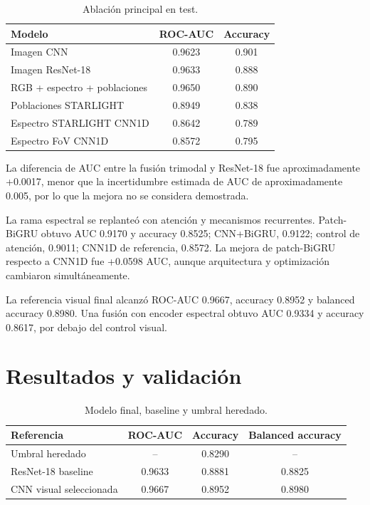 \documentclass[letterpaper,11pt]{article}
\begin{document}
\begin{table}[H]\centering
\caption{Ablación principal en test.}\label{tab:ablacion}
\begin{tabular}{lcc}\toprule
Modelo & ROC-AUC & Accuracy\\\midrule
Imagen CNN & 0.9623 & 0.901\\
Imagen ResNet-18 & 0.9633 & 0.888\\
RGB + espectro + poblaciones & 0.9650 & 0.890\\
Poblaciones STARLIGHT & 0.8949 & 0.838\\
Espectro STARLIGHT CNN1D & 0.8642 & 0.789\\
Espectro FoV CNN1D & 0.8572 & 0.795\\\bottomrule
\end{tabular}\end{table}

La diferencia de AUC entre la fusión trimodal y ResNet-18 fue aproximadamente +0.0017, menor que la incertidumbre estimada de AUC de aproximadamente 0.005, por lo que la mejora no se considera demostrada.

La rama espectral se replanteó con atención y mecanismos recurrentes. Patch-BiGRU obtuvo AUC 0.9170 y accuracy 0.8525; CNN+BiGRU, 0.9122; control de atención, 0.9011; CNN1D de referencia, 0.8572. La mejora de patch-BiGRU respecto a CNN1D fue +0.0598 AUC, aunque arquitectura y optimización cambiaron simultáneamente.

La referencia visual final alcanzó ROC-AUC 0.9667, accuracy 0.8952 y balanced accuracy 0.8980. Una fusión con encoder espectral obtuvo AUC 0.9334 y accuracy 0.8617, por debajo del control visual.

\section{Resultados y validación}
\begin{table}[H]\centering
\caption{Modelo final, baseline y umbral heredado.}\label{tab:final}
\begin{tabular}{lccc}\toprule
Referencia & ROC-AUC & Accuracy & Balanced accuracy\\\midrule
Umbral heredado & -- & 0.8290 & --\\
ResNet-18 baseline & 0.9633 & 0.8881 & 0.8825\\
CNN visual seleccionada & 0.9667 & 0.8952 & 0.8980\\\bottomrule
\end{tabular}\end{table}
\end{document}
